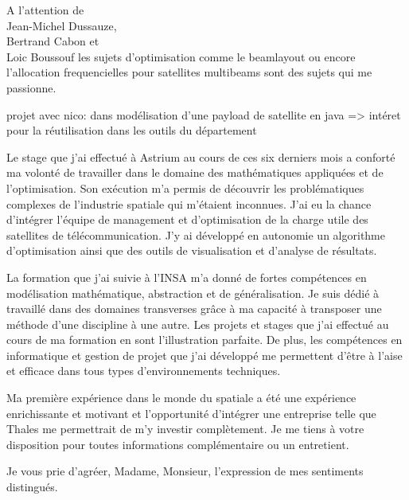 \documentclass[12pt]{lettre}
\begin{document}
\begin{letter}{A l'attention de\\Jean-Michel Dussauze,\\Bertrand Cabon et\\ Loic Boussouf}
les sujets d'optimisation comme le beamlayout ou encore l'allocation frequencielles pour satellites multibeams sont des sujets qui me passionne.

projet avec nico: dans modélisation d'une payload de satellite en java => intéret pour la réutilisation dans les outils du département

Le stage que j'ai effectué à Astrium au cours de ces six derniers mois a conforté ma volonté de travailler dans le domaine des mathématiques appliquées et de l'optimisation. Son exécution m'a permis de découvrir les problématiques complexes de l'industrie spatiale qui m'étaient inconnues. J'ai eu la chance d'intégrer l'équipe de management et d'optimisation de la charge utile des satellites de télécommunication. J'y ai développé en autonomie un algorithme d'optimisation ainsi que des outils de visualisation et d'analyse de résultats.

La formation que j'ai suivie à l'INSA m'a donné de fortes compétences en modélisation mathématique, abstraction et de généralisation. Je suis dédié à travaillé dans des domaines transverses grâce à ma capacité à transposer une méthode d'une discipline à une autre. Les projets et stages que j'ai effectué au cours de ma formation en sont l'illustration parfaite. De plus, les compétences en informatique et gestion de projet que j'ai développé me permettent d'être à l'aise et efficace dans tous types d'environnements techniques.%

Ma première expérience dans le monde du spatiale a été une expérience enrichissante et motivant et l'opportunité d'intégrer une entreprise  telle que Thales me permettrait de m'y investir complètement.
%
Je me tiens à votre disposition pour toutes informations complémentaire ou un entretient.
\closing{Je vous prie d'agréer, Madame, Monsieur, l'expression de mes sentiments distingués.}
\end{letter}
\end{document}
